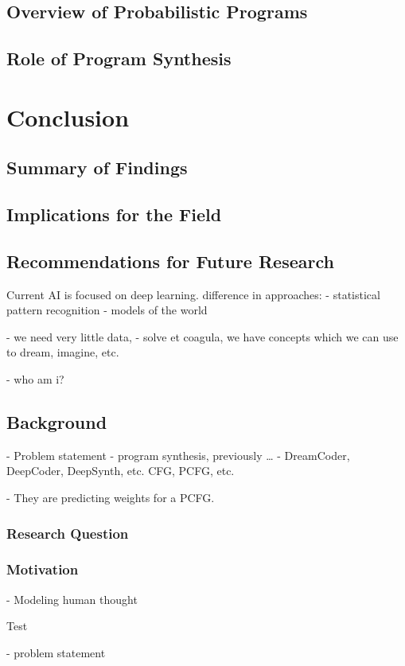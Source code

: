 \documentclass[twocolumn]{article}
\begin{document}
\subsection{Overview of Probabilistic Programs}
\subsection{Role of Program Synthesis}

\section{Conclusion}
\subsection{Summary of Findings}
\subsection{Implications for the Field}
\subsection{Recommendations for Future Research}








Current AI is focused on deep learning.
difference in approaches:
- statistical pattern recognition
- models of the world

- we need very little data, 
- solve et coagula, we have concepts which we can use to dream, imagine, etc. 

- who am i? 


\subsection{Background}\label{sec:background}
- Problem statement
- program synthesis, previously \dots
- DreamCoder, DeepCoder, DeepSynth, etc. 
CFG, PCFG, etc. 

- They are predicting weights for a PCFG.



\subsubsection{Research Question}

\subsubsection{Motivation}
- Modeling human thought
\begin{description}
        \item[Test]
\end{description}
- problem statement 
\end{document}
